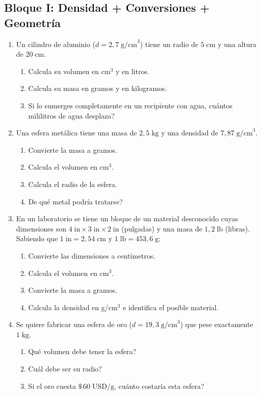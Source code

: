 \documentclass[12pt, letterpaper]{article}
\begin{document}
\subsection{Bloque I: Densidad + Conversiones + Geometría}

\begin{enumerate}[leftmargin=*]
  \item \medio{} Un cilindro de aluminio ($d = 2{,}7\;\text{g/cm}^3$) tiene un radio de $5\;\text{cm}$ y una altura de $20\;\text{cm}$.
  \begin{enumerate}[label=\alph*)]
    \item Calcula su volumen en cm$^3$ y en litros.
    \item Calcula su masa en gramos y en kilogramos.
    \item Si lo sumerges completamente en un recipiente con agua, \textquestiondown cuántos mililitros de agua desplaza?
  \end{enumerate}

  \item \medio{} Una esfera metálica tiene una masa de $2{,}5\;\text{kg}$ y una densidad de $7{,}87\;\text{g/cm}^3$.
  \begin{enumerate}[label=\alph*)]
    \item Convierte la masa a gramos.
    \item Calcula el volumen en cm$^3$.
    \item Calcula el radio de la esfera.
    \item \textquestiondown De qué metal podría tratarse?
  \end{enumerate}

  \item \dificil{} En un laboratorio se tiene un bloque de un material desconocido cuyas dimensiones son $4\;\text{in} \times 3\;\text{in} \times 2\;\text{in}$ (pulgadas) y una masa de $1{,}2\;\text{lb}$ (libras). Sabiendo que $1\;\text{in} = 2{,}54\;\text{cm}$ y $1\;\text{lb} = 453{,}6\;\text{g}$:
  \begin{enumerate}[label=\alph*)]
    \item Convierte las dimensiones a centímetros.
    \item Calcula el volumen en cm$^3$.
    \item Convierte la masa a gramos.
    \item Calcula la densidad en g/cm$^3$ e identifica el posible material.
  \end{enumerate}

  \item \dificil{} Se quiere fabricar una esfera de oro ($d = 19{,}3\;\text{g/cm}^3$) que pese exactamente $1\;\text{kg}$.
  \begin{enumerate}[label=\alph*)]
    \item \textquestiondown Qué volumen debe tener la esfera?
    \item \textquestiondown Cuál debe ser su radio?
    \item Si el oro cuesta $\$\,60\;\text{USD/g}$, \textquestiondown cuánto costaría esta esfera?
  \end{enumerate}
\end{enumerate}
\end{document}
